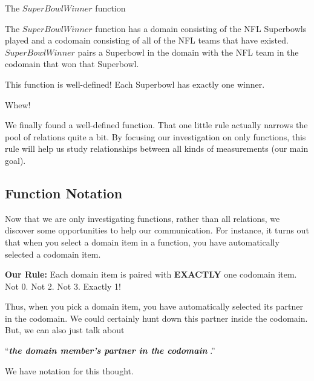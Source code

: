 \documentclass{ximera}
\begin{document}
\begin{example} The $SuperBowlWinner$ function  

The $SuperBowlWinner$ function has a domain consisting of the NFL Superbowls played and a codomain consisting of all of the NFL teams that have existed.  $SuperBowlWinner$ pairs a Superbowl in the domain with the NFL team in the codomain that won that Superbowl.  

This function is well-defined! Each Superbowl has exactly one winner.
\end{example}



Whew!  

We finally found a well-defined function. That one little rule actually narrows the pool of relations quite a bit.  By focusing our investigation on only functions, this rule will help us study relationships between all kinds of measurements (our main goal). 












\subsection*{Function Notation}

Now that we are only investigating functions, rather than all relations, we discover some opportunities to help our communication.  For instance, it turns out that when you select a domain item in a function, you have automatically selected a codomain item.

\textbf{Our Rule:} Each domain item is paired with \textbf{\textcolor{purple!85!blue}{EXACTLY}} one codomain item.  Not 0. Not 2.  Not 3.  Exactly 1!  


Thus, when you pick a domain item, you have automatically selected its partner in the codomain.  We could certainly hunt down this partner inside the codomain.  But, we can also just talk about 






\begin{center}
``\textit{\textbf{\textcolor{blue!55!black}{the domain member's partner in the codomain}} }.'' 
\end{center}



We have notation for this thought. 
\end{document}
